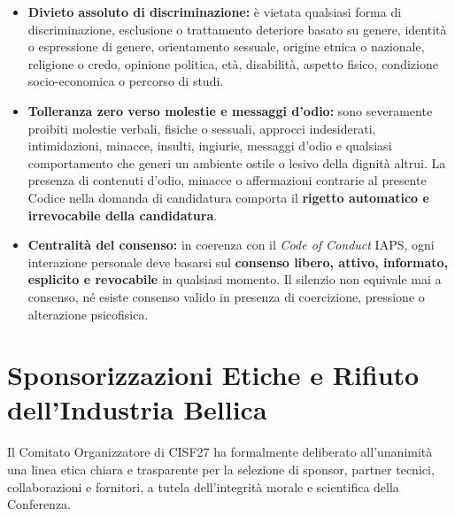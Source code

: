 \documentclass[10pt,a4paper]{article}
\begin{document}
\begin{itemize}
  \item \textbf{Divieto assoluto di discriminazione:} è vietata qualsiasi forma di discriminazione, esclusione o trattamento deteriore basato su genere, identità o espressione di genere, orientamento sessuale, origine etnica o nazionale, religione o credo, opinione politica, età, disabilità, aspetto fisico, condizione socio-economica o percorso di studi.
  \item \textbf{Tolleranza zero verso molestie e messaggi d'odio:} sono severamente proibiti molestie verbali, fisiche o sessuali, approcci indesiderati, intimidazioni, minacce, insulti, ingiurie, messaggi d'odio e qualsiasi comportamento che generi un ambiente ostile o lesivo della dignità altrui. La presenza di contenuti d'odio, minacce o affermazioni contrarie al presente Codice nella domanda di candidatura comporta il \textbf{rigetto automatico e irrevocabile della candidatura}.
  \item \textbf{Centralità del consenso:} in coerenza con il \textit{Code of Conduct} IAPS, ogni interazione personale deve basarsi sul \textbf{consenso libero, attivo, informato, esplicito e revocabile} in qualsiasi momento. Il silenzio non equivale mai a consenso, né esiste consenso valido in presenza di coercizione, pressione o alterazione psicofisica.
\end{itemize}

\section{Sponsorizzazioni Etiche e Rifiuto dell'Industria Bellica}

Il Comitato Organizzatore di CISF27 ha formalmente deliberato all'unanimità una linea etica chiara e trasparente per la selezione di sponsor, partner tecnici, collaborazioni e fornitori, a tutela dell'integrità morale e scientifica della Conferenza.
\end{document}
